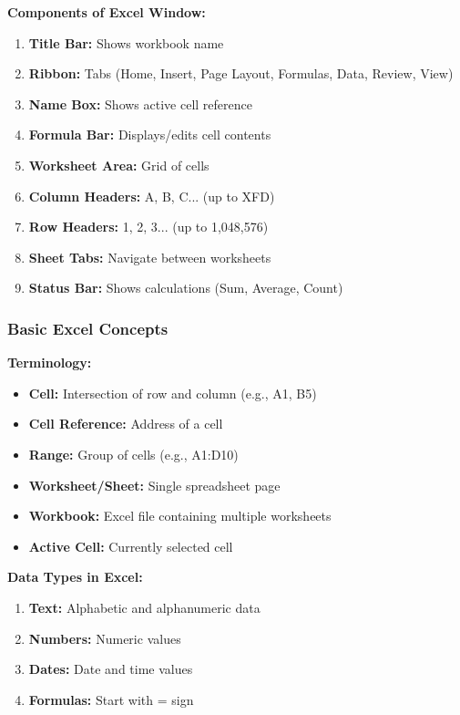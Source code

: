 \documentclass[12pt,a4paper]{article}
\begin{document}
\textbf{Components of Excel Window:}
\begin{enumerate}
    \item \textbf{Title Bar:} Shows workbook name
    \item \textbf{Ribbon:} Tabs (Home, Insert, Page Layout, Formulas, Data, Review, View)
    \item \textbf{Name Box:} Shows active cell reference
    \item \textbf{Formula Bar:} Displays/edits cell contents
    \item \textbf{Worksheet Area:} Grid of cells
    \item \textbf{Column Headers:} A, B, C... (up to XFD)
    \item \textbf{Row Headers:} 1, 2, 3... (up to 1,048,576)
    \item \textbf{Sheet Tabs:} Navigate between worksheets
    \item \textbf{Status Bar:} Shows calculations (Sum, Average, Count)
\end{enumerate}

\subsubsection{Basic Excel Concepts}

\textbf{Terminology:}
\begin{itemize}
    \item \textbf{Cell:} Intersection of row and column (e.g., A1, B5)
    \item \textbf{Cell Reference:} Address of a cell
    \item \textbf{Range:} Group of cells (e.g., A1:D10)
    \item \textbf{Worksheet/Sheet:} Single spreadsheet page
    \item \textbf{Workbook:} Excel file containing multiple worksheets
    \item \textbf{Active Cell:} Currently selected cell
\end{itemize}

\textbf{Data Types in Excel:}
\begin{enumerate}
    \item \textbf{Text:} Alphabetic and alphanumeric data
    \item \textbf{Numbers:} Numeric values
    \item \textbf{Dates:} Date and time values
    \item \textbf{Formulas:} Start with = sign
\end{enumerate}
\end{document}
